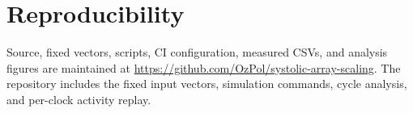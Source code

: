 \documentclass[conference]{IEEEtran}
\begin{document}
\section*{Reproducibility}
Source, fixed vectors, scripts, CI configuration, measured CSVs, and analysis figures are maintained at \url{https://github.com/OzPol/systolic-array-scaling}. The repository includes the fixed input vectors, simulation commands, cycle analysis, and per-clock activity replay.
\end{document}
